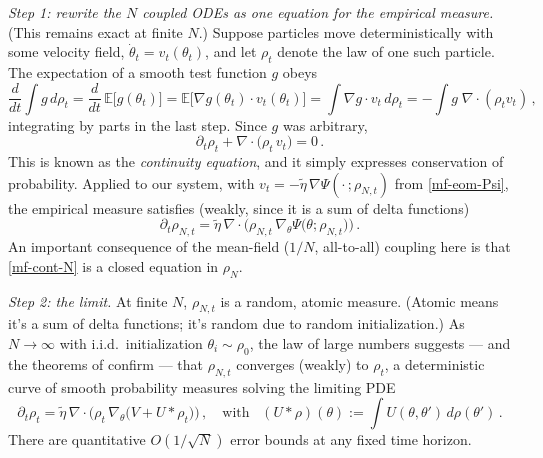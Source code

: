 \documentclass[11pt]{article}
\newcommand{\E}{\mathbb{E}}
\newcommand{\pd}{\partial}
\begin{document}
\emph{Step 1: rewrite the $N$ coupled ODEs as one equation for the empirical measure.} (This remains exact at finite $N$.) Suppose particles move deterministically with some velocity field, $\dot\theta_t = v_t(\theta_t)$, and let $\rho_t$ denote the law of one such particle.
The expectation of a smooth test function $g$ obeys
%
\begin{equation}
    \frac{d}{dt}\int g\,d\rho_t = \frac{d}{dt}\,\E\big[g(\theta_t)\big] = \E\big[\nabla g(\theta_t)\cdot v_t(\theta_t)\big] = \int \nabla g\cdot v_t\, d\rho_t = -\int g\;\nabla\!\cdot\!(\rho_t v_t)\,,
\end{equation}
%
integrating by parts in the last step. Since $g$ was arbitrary,
%
\begin{equation} \label{mf-cont}
    \pd_t\rho_t + \nabla\!\cdot\!\big(\rho_t\, v_t\big) = 0\,.
\end{equation}
%
This is known as the \emph{continuity equation}, and it simply expresses conservation of probability. Applied to our system, with $v_t = -\tilde\eta\,\nabla\Psi(\cdot\,;\rho_{N,t})$ from \eqref{mf-eom-Psi}, the empirical measure satisfies (weakly, since it is a sum of delta functions)
%
\begin{equation} \label{mf-cont-N}
    \pd_t \rho_{N,t} = \tilde\eta\,\nabla\!\cdot\!\Big(\rho_{N,t}\,\nabla_\theta \Psi\big(\theta;\rho_{N,t}\big)\Big)\,.
\end{equation}
%
An important consequence of the mean-field ($1/N$, all-to-all) coupling here is that \eqref{mf-cont-N} is a closed equation in $\rho_N$. 

\emph{Step 2: the limit.} At finite $N$, $\rho_{N,t}$ is a random, atomic measure. (Atomic means it's a sum of delta functions; it's random due to random initialization.)  As $N\to\infty$ with i.i.d.\ initialization $\theta_i\sim\rho_0$, the law of large numbers suggests --- and the theorems of \cite{mei2018mean,chizat2018global,rotskoff2022trainability,sirignano2020mean} confirm --- that $\rho_{N,t}$ converges (weakly) to $\rho_t$, a deterministic curve of smooth probability measures solving the limiting PDE
%
\begin{equation} \label{mf-pde}
    \pd_t\rho_t = \tilde\eta\, \nabla\!\cdot\!\Big(\rho_t\,\nabla_\theta\big(V + U*\rho_t\big)\Big)\,,\quad \text{with}\;\;\; (U*\rho)(\theta):=\int U(\theta,\theta')\,d\rho(\theta')\,.
\end{equation}
%
There are quantitative $O(1/\sqrt N)$ error bounds at any fixed time horizon. %
\end{document}
